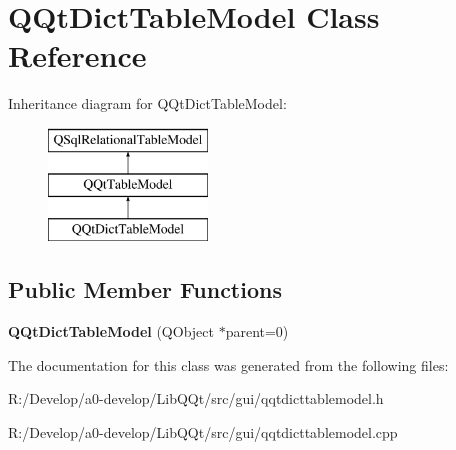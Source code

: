 \hypertarget{class_q_qt_dict_table_model}{}\section{Q\+Qt\+Dict\+Table\+Model Class Reference}
\label{class_q_qt_dict_table_model}
Inheritance diagram for Q\+Qt\+Dict\+Table\+Model\+:\begin{figure}[H]
\begin{center}
\leavevmode
\includegraphics[height=3.000000cm]{class_q_qt_dict_table_model}
\end{center}
\end{figure}
\subsection*{Public Member Functions}
\begin{DoxyCompactItemize}
\item 
\mbox{\label{class_q_qt_dict_table_model_a3559735ceb9f827d98f22347ba3d0f4b}} 
{\bfseries Q\+Qt\+Dict\+Table\+Model} (Q\+Object $\ast$parent=0)
\end{DoxyCompactItemize}


The documentation for this class was generated from the following files\+:\begin{DoxyCompactItemize}
\item 
R\+:/\+Develop/a0-\/develop/\+Lib\+Q\+Qt/src/gui/qqtdicttablemodel.\+h\item 
R\+:/\+Develop/a0-\/develop/\+Lib\+Q\+Qt/src/gui/qqtdicttablemodel.\+cpp\end{DoxyCompactItemize}
